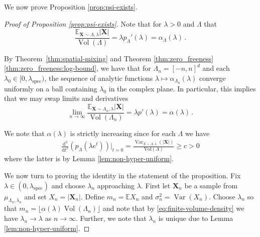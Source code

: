 \documentclass[10pt]{amsart}
\theoremstyle{definition}
\theoremstyle{remark}
\newcommand{\spec}{{\mathrm{spec}}}
\newcommand{\bX}{\mathbf{X}}
\newcommand{\Vol}{\operatorname{Vol}}
\newcommand{\E}{\mathbb{E}}
\newcommand{\diff}{\mathrm{d}}
\newcommand{\vol}{\mathrm{Vol}}
\newcommand{\Var}{{\operatorname{Var}}}
\begin{document}
	We now prove Proposition \ref{prop:psi-exists}.
	\begin{proof}[Proof of Proposition \ref{prop:psi-exists}]
		
		Note that for $\lambda > 0$ and $\Lambda$ that $$\frac{\E_{\bX \sim \Lambda,\lambda} |\bX|}{\Vol(\Lambda)} = \lambda p_{\Lambda}'(\lambda) = \alpha_{\Lambda}(\lambda)\,.$$
		
		By Theorem~\ref{thm:spatial-mixing} and Theorem \ref{thm:zero_freeness}\ref{thm:zero_freeness:log-bound}, we have that for $\Lambda_n = [-n,n]^d$  and each $\lambda_0 \in [0,\lambda_\spec)$, the sequence of analytic functions $\lambda \mapsto \alpha_{\Lambda_n}(\lambda)$ converge uniformly on a ball containing $\lambda_0$ in the complex plane.  In particular, this implies that we may swap limits and derivatives \begin{equation}\label{eq:finite-volume-density}
			\lim_{n \to \infty} \frac{\E_{\bX \sim \Lambda_n,\lambda} |\bX|}{\Vol(\Lambda_n)} = \lambda p'(\lambda) = \alpha(\lambda) \,.
		\end{equation}
		
		We note that $\alpha(\lambda)$ is strictly increasing since for each $\Lambda$ we have 
		\begin{align}\label{eq:finitep-convex}
			\frac{\diff^2}{\diff t^2}( p_{\Lambda}(\lambda e^t)) \big|_{t = 0} = \frac{\Var_{X \sim \Lambda,\lambda}(|\bX|)}{\vol(\Lambda)} \geq c > 0
		\end{align}
		where the latter is by Lemma \ref{lem:non-hyper-uniform}.
		
		
		We now turn to proving the identity in the statement of the proposition. 
		Fix $\lambda\in (0,\lambda_\spec)$ and choose $\lambda_n$ approaching $\lambda$.  First  
		let $\bX_n$ be a sample from $\mu_{\Lambda_n,\lambda_n}$ and set $X_n = |\bX_n|$. Define $m_n = \E X_n$ and $\sigma_n^2 = \Var(X_n)$.   Choose $\lambda_n$ so that $m_n = \lfloor \alpha(\lambda) \Vol(\Lambda_n) \rfloor$ and note that by \eqref{eq:finite-volume-density} we have $\lambda_n \to \lambda$ as $n \to \infty$.  Further, we note that $\lambda_n$ is unique due to Lemma \ref{lem:non-hyper-uniform}.  
		

\end{proof}
\end{document}

